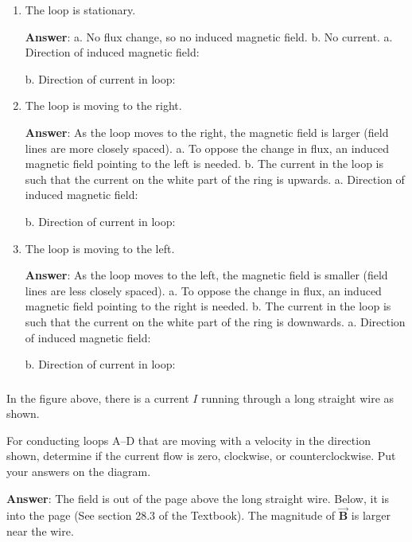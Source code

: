 \documentclass{article}
\newcommand{\bfvec}[1]{\vec{\mathbf{#1}}}
\begin{document}
\begin{enumerate}

  \item The loop is stationary.

        \ifsolutions
        {\bf Answer}: a. No flux change, so no induced magnetic field. b. No current.
        \else
        a. Direction of induced magnetic field:

        b. Direction of current in loop:
        \fi

  \item The loop is moving to the right.

        \ifsolutions
        {\bf Answer}: As the loop moves to the right, the magnetic field is larger (field lines are more closely spaced). a. To oppose the change in flux, an induced magnetic field pointing to the left is needed. b. The current in the loop is such that the current on the white part of the ring is upwards.
        \else
        a. Direction of induced magnetic field:

        b. Direction of current in loop:
        \fi

  \item The loop is moving to the left.

        \ifsolutions
        {\bf Answer}: As the loop moves to the left, the magnetic field is smaller (field lines are less closely spaced). a. To  oppose the change in flux, an induced magnetic field pointing to the right is needed. b. The current in the loop is such that the current on the white part of the ring is downwards.
        \else
        a. Direction of induced magnetic field:

        b. Direction of current in loop:
        \fi

\end{enumerate}

\subsubsection{}



In the figure above, there is a current $I$ running through a long straight wire as shown.

For conducting loops A--D that are moving with a velocity in the direction shown, determine if the current flow is zero, clockwise, or counterclockwise. Put your answers on the diagram.

\ifsolutions
{\bf Answer}: The field is out of the page above the long straight wire. Below, it is into the page (See section 28.3 of the Textbook). The magnitude of $\bfvec{B}$ is larger near the wire.
\end{document}
